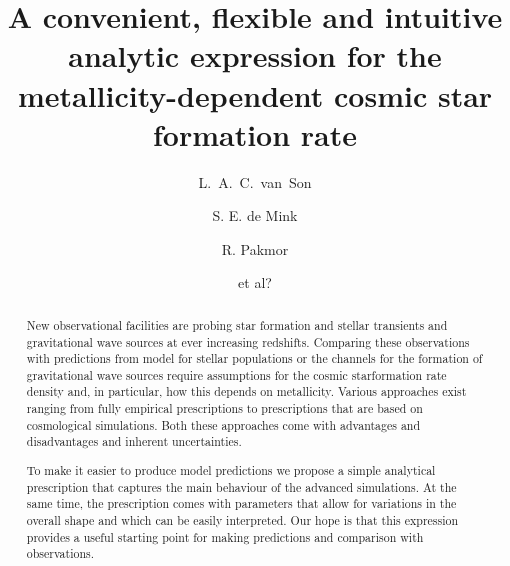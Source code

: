 \documentclass[twocolumn]{aastex631}
\begin{document}
\title{ A convenient, flexible and intuitive analytic expression for the metallicity-dependent cosmic star formation rate  }


\author[0000-0001-5484-4987]{L.~A.~C.~van~Son}

 \author[0000-0001-9336-2825]{S. E. de Mink}

 \author[0000-0003-3308-2420]{R. Pakmor}
 
\author{et al?}


\begin{abstract}
New observational facilities are probing star formation and stellar transients and gravitational wave sources at ever increasing redshifts. Comparing these observations with predictions from model for stellar populations or the channels for the formation of gravitational wave sources require assumptions for the cosmic starformation rate density and, in particular, how this depends on metallicity.  Various approaches exist ranging from fully empirical prescriptions to prescriptions that are based on cosmological simulations. Both these approaches come with advantages and disadvantages and inherent uncertainties. 

To make it easier to produce model predictions we propose a simple analytical prescription that captures the main behaviour of the advanced simulations. At the same time, the prescription comes with parameters that allow for variations in the overall shape and which can be easily interpreted. Our hope is that this expression provides a useful starting point for making predictions and comparison with observations. 
\end{abstract}
\end{document}
